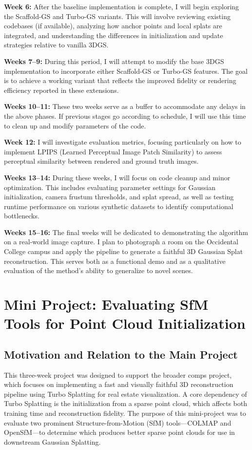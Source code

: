 \documentclass[10pt,twocolumn]{article}
\begin{document}
\textbf{Week 6:} After the baseline implementation is complete, I will begin exploring the Scaffold-GS and Turbo-GS variants. This will involve reviewing existing codebases (if available), analyzing how anchor points and local splats are integrated, and understanding the differences in initialization and update strategies relative to vanilla 3DGS.

\textbf{Weeks 7--9:} During this period, I will attempt to modify the base 3DGS implementation to incorporate either Scaffold-GS or Turbo-GS features. The goal is to achieve a working variant that reflects the improved fidelity or rendering efficiency reported in these extensions.

\textbf{Weeks 10--11:} These two weeks serve as a buffer to accommodate any delays in the above phases. If previous stages go according to schedule, I will use this time to clean up and modify parameters of the code.

\textbf{Week 12:} I will investigate evaluation metrics, focusing particularly on how to implement LPIPS (Learned Perceptual Image Patch Similarity) to assess perceptual similarity between rendered and ground truth images. 

\textbf{Weeks 13--14:} During these weeks, I will focus on code cleanup and minor optimization. This includes evaluating parameter settings for Gaussian initialization, camera frustum thresholds, and splat spread, as well as testing runtime performance on various synthetic datasets to identify computational bottlenecks.

\textbf{Weeks 15--16:} The final weeks will be dedicated to demonstrating the algorithm on a real-world image capture. I plan to photograph a room on the Occidental College campus and apply the pipeline to generate a faithful 3D Gaussian Splat reconstruction. This serves both as a functional demo and as a qualitative evaluation of the method's ability to generalize to novel scenes.



\section{Mini Project: Evaluating SfM Tools for Point Cloud Initialization}

\subsection{Motivation and Relation to the Main Project}
This three-week project was designed to support the broader comps project, which focuses on implementing a fast and visually faithful 3D reconstruction pipeline using Turbo Splatting for real estate visualization. A core dependency of Turbo Splatting is the initialization from a sparse point cloud, which affects both training time and reconstruction fidelity. The purpose of this mini-project was to evaluate two prominent Structure-from-Motion (SfM) tools—COLMAP and OpenSfM—to determine which produces better sparse point clouds for use in downstream Gaussian Splatting.
\end{document}

